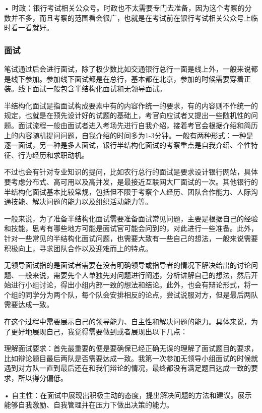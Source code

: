 •	时政：银行考试相关公众号。时政也不太需要专门去准备，因为这个考察的分数并不多，而且考察的范围看会很广，也就是在考试前在银行考试相关公众号上临时看一看就好。

\subsubsection{面试}

笔试通过后会进行面试，除了极少数比如交通银行总行一面是线上外，一般来说都是线下参加。参加线下面试都是在总行，基本都在北京，参加的时候需要穿着正装。线下面试一般包含半结构化面试和无领导面试。

半结构化面试是指面试构成要素中有的内容作统一的要求，有的内容则不作统一的规定，也就是在预先设计好的试题的基础上，考官向应试者又提出一些随机性的问题。面试流程一般由面试者进入考场先进行自我介绍，接着考官会根据介绍和简历上的内容随机提问问题，自我介绍的时间多为1-3分钟。一般有两种形式：一种是逐一面试，另一种是多人面试，银行半结构化面试的考察重点是自我介绍、个性特征、行为经历和求职动机。

不过也会有针对专业知识的提问，比如农行总行的面试是要求设计银行网站，具体要考虑分布式、高可用以及高并发，是最接近互联网大厂面试的一次。其他银行的半结构化面试基本比较常规，包括但不限于考察个人经历、团队合作能力、人际沟通技能、解决问题的能力以及组织活动能力等。

一般来说，为了准备半结构化面试需要准备面试常见问题，主要是根据自己的经验和技能，思考有哪些地方可能是面试官可能会问到的，对此进行一些准备。此外，针对一些常见的半结构化面试问题，也需要大致有一些自己的想法，一般来说需要积极向上，寻求团队合作以及迎难而上的特点。

无领导面试指的是面试者需要在没有明确领导或指导者的情况下解决给出的讨论问题、一般来说，需要先个人单独先对问题进行阐述，分析讲解自己的想法，然后开始进行小组讨论，得出小组内部一致的想法和结论。此外，也会有辩论形式，将一个组的同学分为两个队，每个队会安排相反的论点，尝试说服对方，但是最后两队需要达成一致。

在这个过程中需要展示自己的领导能力、自主性和解决问题的能力。具体来说，为了更好地展现自己，我觉得需要做到或者展现出以下几点：

理解面试要求：首先最重要的便是要确保已经正确无误的理解了面试题目的要求，比如辩论题目最后两队是否需要达成一致。我第一次参加无领导小组面试的时候就遇到对方队一直到最后还在和我们辩论的情况，最终都没有满足题目达成一致的要求，所以得分偏低。

•	自主性：在面试中展现出积极主动的态度，提出解决问题的方法和建议。展示能够自我激励、自我管理并在压力下做出决策的能力。

